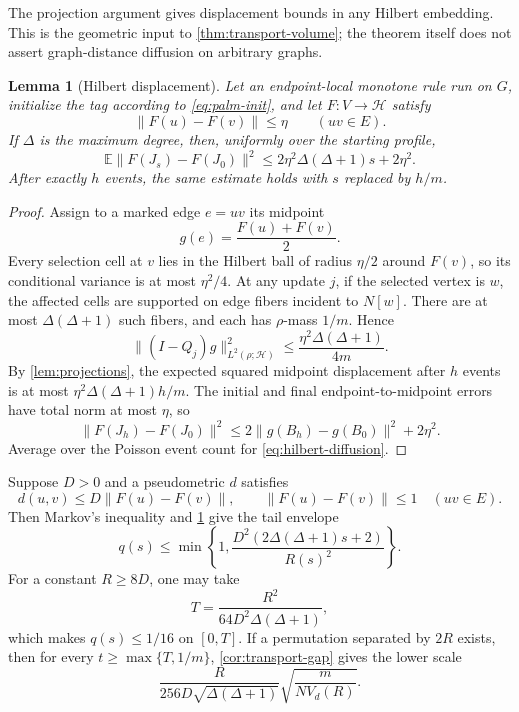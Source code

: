 \documentclass[11pt]{article}
\newtheorem{lemma}[lemma]{Lemma}
\theoremstyle{remark}
\newcommand{\E}{\mathbb{E}}
\newcommand{\norm}[1]{\lVert #1\rVert}
\begin{document}
The projection argument gives displacement bounds in any Hilbert embedding. This is the geometric input to \cref{thm:transport-volume}; the theorem itself does not assert graph-distance diffusion on arbitrary graphs.

\begin{lemma}[Hilbert displacement]\label{lem:hilbert-displacement}
Let an endpoint-local monotone rule run on $G$, initialize the tag according to \eqref{eq:palm-init}, and let $F:V\to \mathcal H$ satisfy
\[
 \norm{F(u)-F(v)}\le \eta
 \qquad(uv\in E).
\]
If $\Delta$ is the maximum degree, then, uniformly over the starting profile,
\[
 \E\norm{F(J_s)-F(J_0)}^2
 \le2\eta^2\Delta(\Delta+1)s+2\eta^2.
 \tag{7.1}\label{eq:hilbert-diffusion}
\]
After exactly $h$ events, the same estimate holds with $s$ replaced by $h/m$.
\end{lemma}

\begin{proof}
Assign to a marked edge $e=uv$ its midpoint
\[
 g(e)=\frac{F(u)+F(v)}2.
\]
Every selection cell at $v$ lies in the Hilbert ball of radius $\eta/2$ around $F(v)$, so its conditional variance is at most $\eta^2/4$. At any update $j$, if the selected vertex is $w$, the affected cells are supported on edge fibers incident to $N[w]$. There are at most $\Delta(\Delta+1)$ such fibers, and each has $\rho$-mass $1/m$. Hence
\[
 \norm{(I-Q_j)g}_{L^2(\rho;\mathcal H)}^2
 \le\frac{\eta^2\Delta(\Delta+1)}{4m}.
\]
By \cref{lem:projections}, the expected squared midpoint displacement after $h$ events is at most $\eta^2\Delta(\Delta+1)h/m$. The initial and final endpoint-to-midpoint errors have total norm at most $\eta$, so
\[
 \norm{F(J_h)-F(J_0)}^2
 \le2\norm{g(B_h)-g(B_0)}^2+2\eta^2.
\]
Average over the Poisson event count for \eqref{eq:hilbert-diffusion}.
\end{proof}

Suppose $D>0$ and a pseudometric $d$ satisfies
\[
 d(u,v)\le D\norm{F(u)-F(v)},
 \qquad
 \norm{F(u)-F(v)}\le1\quad(uv\in E).
 \tag{7.2}\label{eq:embedding-distortion}
\]
Then Markov's inequality and \cref{lem:hilbert-displacement} give the tail envelope
\[
 q(s)\le
 \min\left\{1,
 \frac{D^2(2\Delta(\Delta+1)s+2)}{R(s)^2}
 \right\}.
 \tag{7.3}\label{eq:embedding-tail}
\]
For a constant $R\ge8D$, one may take
\[
 T=\frac{R^2}{64D^2\Delta(\Delta+1)},
\]
which makes $q(s)\le1/16$ on $[0,T]$. If a permutation separated by $2R$ exists, then for every $t\ge\max\{T,1/m\}$, \cref{cor:transport-gap} gives the lower scale
\[
 \frac{R}{256D\sqrt{\Delta(\Delta+1)}}
 \sqrt{\frac m{N V_d(R)}}.
 \tag{7.4}\label{eq:single-scale-graph}
\]
\end{document}
